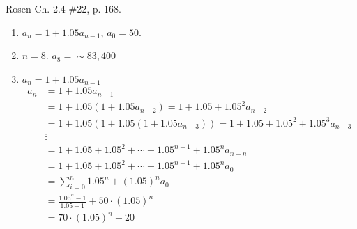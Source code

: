 \begin{questions}
\bonusquestion[4] Rosen Ch. 2.4 \#22, p. 168.
\begin{solution}
\begin{enumerate}[label=(\alph*), itemsep=0pt,parsep=0pt,topsep=0pt,partopsep=0pt]
  \item $a_n = 1+ 1.05a_{n-1}$, $a_0 = 50$. 
  \item $n = 8$. $a_8 = \sim 83,400$
  \item $a_n = 1 + 1.05a_{n-1}$ 
  \begin{align*}
    a_n &= 1 + 1.05a_{n-1} \\
     &= 1 + 1.05(1 + 1.05a_{n-2}) = 1 + 1.05 + 1.05^2a_{n-2} \\
     &= 1 + 1.05(1 + 1.05(1 + 1.05a_{n-3})) = 1 + 1.05 + 1.05^2 + 1.05^3a_{n-3} \\
     & \vdots \\
     &= 1 + 1.05 + 1.05^2 + \cdots + 1.05^{n-1} + 1.05^n a_{n-n} \\
     &= 1 + 1.05 + 1.05^2 + \cdots + 1.05^{n-1} + 1.05^n a_{0} \\
     &= \sum_{i=0}^n 1.05^n + (1.05)^n a_{0} \\
     &= \frac{1.05^n - 1}{1.05 - 1} + 50\cdot (1.05)^n \\
     &= 70\cdot (1.05)^n - 20 
  \end{align*}
\end{enumerate}
\end{solution}




\end{questions}
